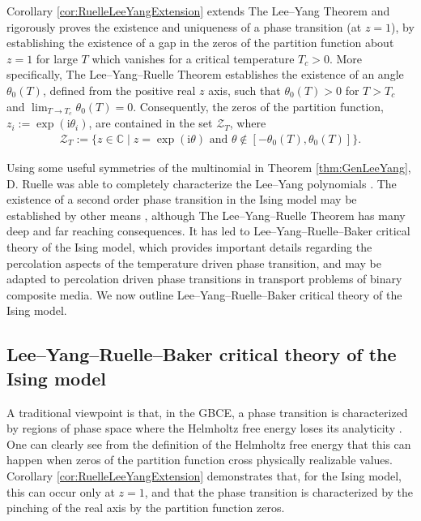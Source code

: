 \documentclass[english,12pt]{ttuthes}
\newcommand{\I}{\mathrm{i}}
\begin{document}
Corollary \ref{cor:RuelleLeeYangExtension} extends The Lee--Yang
Theorem and rigorously proves the existence and uniqueness of a phase
transition (at $z=1$), by establishing the existence of a gap in the
zeros of the partition function about $z=1$ for large $T$ which
vanishes for a critical temperature $T_c>0$. More specifically, The
Lee--Yang--Ruelle Theorem establishes the existence of an angle
$\theta_0(T)$, defined from the positive real $z$ axis, such that
$\theta_0(T)>0$ for $T>T_c$ and $\lim_{T\to T_c}\theta_0(T)=0$. Consequently, the zeros of the
partition function, $z_i:=\exp(\I\theta_{i})$, are contained in the set
$\mathcal{Z}_T$, where  
%
\begin{align}
  \mathcal{Z}_T
   :=\{z\in\mathbb{C}\;|\; z=\exp(\I\theta) \text{ and } \theta\not\in[-\theta_{0}(T),\theta_{0}(T)]\}.
\end{align}
%

Using some useful symmetries of the multinomial in Theorem
\eqref{thm:GenLeeYang}, D. Ruelle was able to completely characterize 
the Lee--Yang polynomials \cite{Ruelle:AM:589}. The existence of a
second order phase transition in the Ising model may be established by
other means \cite{Ruelle-1969,Firas}, although The Lee--Yang--Ruelle
Theorem has many deep and far reaching consequences. It has led to
Lee--Yang--Ruelle--Baker critical theory of the Ising model, which 
provides important details regarding the percolation aspects of the
temperature driven phase transition, and may be adapted to percolation
driven phase transitions in transport problems of binary composite
media. We now outline Lee--Yang--Ruelle--Baker critical theory of the
Ising model.      
%
\subsection{Lee--Yang--Ruelle--Baker critical theory
of the Ising model}\label{sec:LYRB_Crit_Theory}
%
A traditional viewpoint is that, in the GBCE, a phase transition
is characterized by regions of phase space where the Helmholtz free
energy loses its analyticity
\cite{Christensen-2005,Robertson-1993,Baker-1990}. One can clearly see   
from the definition of the Helmholtz free energy that this can happen
when zeros of the partition function cross physically realizable
values. Corollary \ref{cor:RuelleLeeYangExtension} demonstrates that,
for the Ising model, this can occur only at $z=1$, and that the phase
transition is characterized by the pinching of the real axis by the
partition function zeros.
\end{document}
